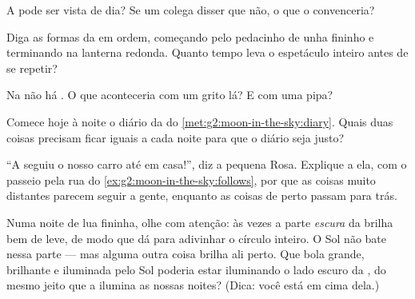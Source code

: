 \begin{exercise}[$\star$]\label{exo:g2:moon-in-the-sky:5}
A  pode ser vista de dia? Se um colega disser que não, o que o
convenceria?
\end{exercise}

\begin{exercise}[$\star$]\label{exo:g2:moon-in-the-sky:6}
Diga as formas da  em ordem, começando pelo pedacinho de unha
fininho e terminando na lanterna redonda. Quanto tempo leva o
espetáculo inteiro antes de se repetir?
\end{exercise}

\begin{exercise}[$\star$]\label{exo:g2:moon-in-the-sky:7}
Na  não há . O que aconteceria com um grito lá? E com uma pipa?
\end{exercise}

\begin{exercise}[$\star$]\label{exo:g2:moon-in-the-sky:8}
Comece hoje à noite o diário da  do
\cref{met:g2:moon-in-the-sky:diary}. Quais duas coisas precisam ficar
iguais a cada noite para que o diário seja justo?
\end{exercise}

\begin{exercise}[$\star\star$]\label{exo:g2:moon-in-the-sky:9}
``A  seguiu o nosso carro até em casa!'', diz a pequena Rosa.
Explique a ela, com o passeio pela rua do
\cref{ex:g2:moon-in-the-sky:follows}, por que as coisas muito
distantes parecem seguir a gente, enquanto as coisas de perto passam
para trás.
\end{exercise}

\begin{exercise}[$\star\star$]\label{exo:g2:moon-in-the-sky:10}
Numa noite de lua fininha, olhe com atenção: às vezes a parte
\emph{escura} da  brilha bem de leve, de modo que dá para adivinhar
o círculo inteiro. O Sol não bate nessa parte --- mas alguma outra
coisa brilha ali perto. Que bola grande, brilhante e iluminada pelo
Sol poderia estar iluminando o lado escuro da , do mesmo jeito que
a  ilumina as nossas noites? (Dica: você está em cima dela.)
\end{exercise}
